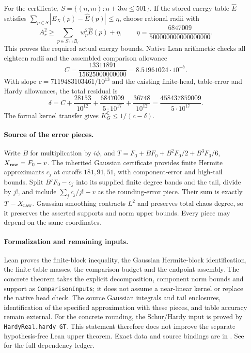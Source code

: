 \documentclass[11pt]{article}
\begin{document}
For the certificate, $S=\{(n,m):n+3m\le501\}$. If the stored energy table
$\widehat E$ satisfies
$\sum_{p\in S}|E_X(p)-\widehat E(p)|\le\eta$, choose rational radii with
\[
 A_r^2\ge\sum_{p\in S\cap B_r}w_p^2\widehat E(p)+\eta,
 \qquad \eta=\frac{6847009}{500000000000000000}.
\]
This proves the required actual energy bounds. Native Lean arithmetic checks
all eighteen radii and the assembled comparison allowance
\[
 C=\frac{13311891}{15625000000000}=8.51961024\cdot10^{-7}.
\]
With slope $c=7119483103461/10^{13}$ and the existing finite-head, table-error
and Hardy allowances, the total residual is
\[
 \delta=C+\frac{28153}{10^{12}}+
 \frac{6847009}{5\cdot10^{17}}+\frac{36748}{10^{12}}
 =\frac{458437859009}{5\cdot10^{17}}.
\]
The formal kernel transfer gives $K_G^{\mathbb C}\le1/(c-\delta)$.

\paragraph{Source of the error pieces.}
Write $B$ for multiplication by $i\phi$, and
$T=F_0+BF_0+B^2F_0/2+B^3F_0/6$, $X_{\rm raw}=F_0+v$.
The inherited Gaussian certificate provides finite Hermite approximants
$c_j$ at cutoffs $181,91,51$, with component-error and high-tail bounds.
Split $B^jF_0-c_j$ into its supplied finite degree bands and the tail, divide
by $j!$, and include $\sum_jc_j/j!-v$ as the rounding-error piece.
Their sum is exactly $T-X_{\rm raw}$. Gaussian smoothing contracts $L^2$
and preserves total chaos degree, so it preserves the asserted supports and
norm upper bounds. Every piece may depend on the same coordinates.

\paragraph{Formalization and remaining inputs.}
Lean proves the finite-block inequality, the Gaussian Hermite-block
identification, the finite table masses, the comparison budget and the
endpoint assembly. The concrete theorem takes the explicit decomposition,
component norm bounds and support as \texttt{ComparisonInputs}; it does not
assume a near-linear kernel or replace the native head check.
The source Gaussian integrals and tail enclosures, identification of the
specified approximation with these pieces, and table accuracy remain external.
For the concrete rounding, the Schur/Hardy input is proved by
\texttt{HardyReal.hardy\_GT}. This statement therefore does not improve
the separate hypothesis-free Lean upper theorem.
Exact data and source bindings are in
.
See  for the full dependency ledger.
\end{document}
